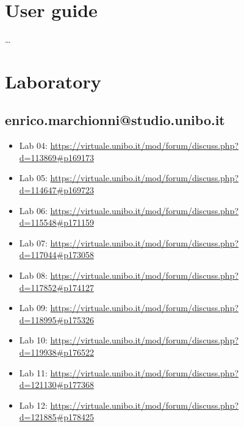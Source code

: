 \documentclass[12pt, a4paper]{report}
\begin{document}
\appendix

\chapter{User guide}

    \dots

\chapter{Laboratory}

\section{enrico.marchionni@studio.unibo.it}

\begin{itemize}
    \item Lab 04: \url{https://virtuale.unibo.it/mod/forum/discuss.php?d=113869#p169173}
    \item Lab 05: \url{https://virtuale.unibo.it/mod/forum/discuss.php?d=114647#p169723}
    \item Lab 06: \url{https://virtuale.unibo.it/mod/forum/discuss.php?d=115548#p171159}
    \item Lab 07: \url{https://virtuale.unibo.it/mod/forum/discuss.php?d=117044#p173058}
    \item Lab 08: \url{https://virtuale.unibo.it/mod/forum/discuss.php?d=117852#p174127}
    \item Lab 09: \url{https://virtuale.unibo.it/mod/forum/discuss.php?d=118995#p175326}
    \item Lab 10: \url{https://virtuale.unibo.it/mod/forum/discuss.php?d=119938#p176522}
    \item Lab 11: \url{https://virtuale.unibo.it/mod/forum/discuss.php?d=121130#p177368}
    \item Lab 12: \url{https://virtuale.unibo.it/mod/forum/discuss.php?d=121885#p178425}
\end{itemize}

\printbibliography
\end{document}
